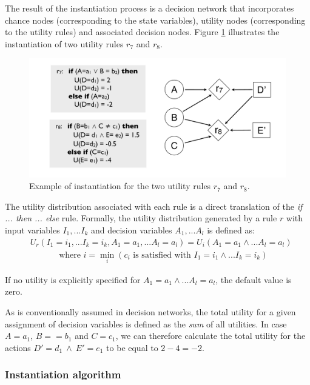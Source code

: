 The result of the instantiation process is a decision network that incorporates chance nodes (corresponding to the state variables), utility nodes (corresponding to the utility rules) and associated decision nodes. Figure \ref{fig:instantitionutil} illustrates the instantiation of two utility rules $r_7$ and $r_8$. 

\begin{figure}[h]
\centering
\includegraphics[scale=0.25]{imgs/ruleinstantiation2.pdf}
\caption{Example of instantiation for the two utility rules $r_7$ and $r_8$.}
\label{fig:instantitionutil}
\end{figure}


The utility distribution associated with each rule is a direct translation of the  \textit{if ... then ... else} rule.  Formally, the utility distribution generated by a rule $r$ with input variables $I_1,...I_k$ and decision variables $A_1,...A_l$ is defined as:
\begin{align}
& U_r(I_1\!=\!i_1,... I_k\!=\!i_k, A_1\!=\!a_1,... A_l\!=\!a_l) = U_i(A_1\!=\!a_1 \land... A_l\!=\!a_l) \label{eq:utildistrib}\\
&  \; \; \; \; \; \; \; \;  \; \; \; \text{ where } i = \min_i (c_i \text{ is satisfied with } I_1\!=\!i_1 \land ... I_k\!=\!i_k) \nonumber
\end{align}

If no utility is explicitly specified for $A_1\!=\!a_1 \land... A_l\!=\!a_l$, the default value is zero. 

As is conventionally assumed in decision networks, the total utility for a given assignment of decision variables is defined as the \textit{sum} of all utilities.  In case $A\!=\!a_1$, $B=\!=\!b_1$ and $C\!=\!c_1$, we can therefore calculate the total utility for the actions $D'\!=\!d_1 \ \land \ E'\!=\!e_1$ to be equal to $2 - 4 = -2$. 


\subsubsection*{Instantiation algorithm} 

